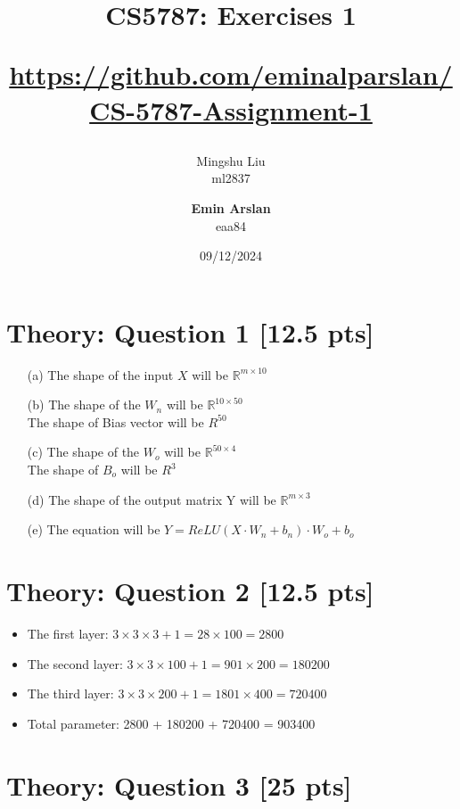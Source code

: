 \documentclass{article}
\title{CS5787: Exercises 1 \\ \begin{small}\url{https://github.com/eminalparslan/CS-5787-Assignment-1}\end{small}}
\author{Mingshu Liu \\ ml2837 \and \textbf{Emin Arslan} \\ eaa84}
\date{09/12/2024}
\begin{document}
\maketitle

\section{Theory: Question 1 [12.5 pts]}

\begin{itemize}
    \item[(a)] The shape of the input $X$ will be $\mathbb {R}^{m\times 10}$
    \item[(b)] The shape of the $W_n$ will be $\mathbb {R}^{10\times 50}$ \\
    The shape of Bias vector will be ${R}^{50}$
    \item[(c)] The shape of the $W_o$ will be $\mathbb {R}^{50\times 4}$ \\
    The shape of  $B_o$ will be ${R}^{3}$
    \item[(d)] The shape of the output matrix Y will be $\mathbb{R}^{m \times 3}$
    \item[(e)] The equation will be $Y = ReLU(X\cdot W_n + b_n)\cdot W_o + b_o$
\end{itemize}

\section{Theory: Question 2 [12.5 pts]}

\begin{itemize}
    \item The first layer: $3 \times 3 \times 3 + 1 = 28 \times 100 = 2800$
    \item The second layer:  $3 \times 3 \times 100 + 1 = 901 \times 200 = 180200$
    \item  The third layer: $3 \times 3 \times 200 + 1 = 1801 \times 400 = 720400$
    \item Total parameter: 2800 + 180200 + 720400 = 903400
\end{itemize}

\section{Theory: Question 3 [25 pts]}
\end{document}
